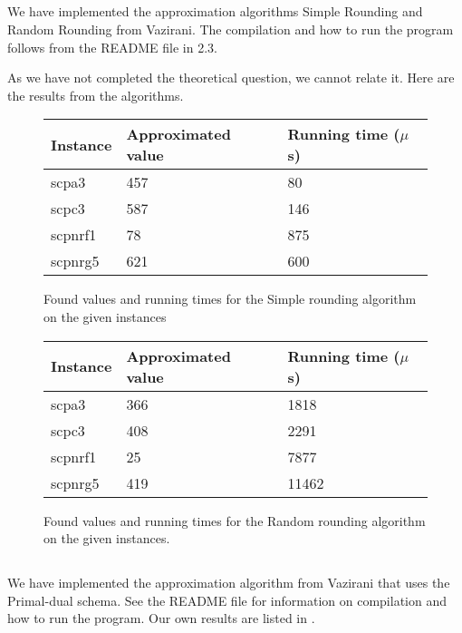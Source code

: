 \documentclass[11pt]{article}
\begin{document}
\subsection{}
We have implemented the approximation algorithms Simple Rounding and Random Rounding from Vazirani. The compilation and how to run the program follows from the README file in 2.3.

As we have not completed the theoretical question, we cannot relate it.
Here are the results from the algorithms.
\begin{figure}[H]
    \centering
    \begin{tabular}{lll}
        \toprule
        Instance & Approximated value & Running time ($\mu$s) \\
        \midrule
        scpa3       & 457     & 80    \\
        scpc3       & 587     & 146   \\
        scpnrf1     & 78      & 875   \\
        scpnrg5     & 621     & 600   \\
        \bottomrule
    \end{tabular}
    \caption{Found values and running times for the Simple rounding algorithm on the given instances}\label{fig:simpleround}
\end{figure}

\begin{figure}[H]
    \centering
    \begin{tabular}{lll}
        \toprule
        Instance & Approximated value & Running time ($\mu$s) \\
        \midrule
        scpa3       & 366     & 1818    \\
        scpc3       & 408     & 2291    \\
        scpnrf1     & 25      & 7877    \\
        scpnrg5     & 419     & 11462   \\
        \bottomrule
    \end{tabular}
    \caption{Found values and running times for the Random rounding algorithm on the given instances.}\label{fig:randomround}
\end{figure}


\subsection{}
We have implemented the approximation algorithm from Vazirani that uses the
Primal-dual schema. See the README file for information on compilation and how
to run the program. Our own results are listed in .
\end{document}
